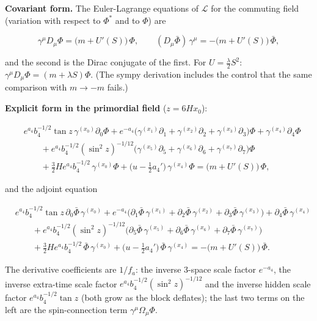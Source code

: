\documentclass[11pt]{article}
\begin{document}
\textbf{Covariant form.} The Euler-Lagrange equations of $\mathcal{L}$ for the commuting field (variation with respect to $\Phi^*$ and to $\Phi$) are

\[
\gamma^\mu D_\mu\Phi = \big(m + U'(S)\big)\,\Phi, \qquad (D_\mu\bar\Phi)\,\gamma^\mu = -\big(m + U'(S)\big)\,\bar\Phi ,
\]

and the second is the Dirac conjugate of the first. For $U = \tfrac{\lambda}{2}S^2$: $\gamma^\mu D_\mu\Phi = (m + \lambda S)\Phi$. (The sympy derivation includes the control that the same comparison with $m \to -m$ fails.)

\textbf{Explicit form in the primordial field} ($z = 6Hx_0$):

\[
\begin{aligned}
& e^{a_4}b_4^{-1/2}\tan z\,\gamma^{(x_0)}\partial_0\Phi + e^{-a_4}\big(\gamma^{(x_1)}\partial_1 + \gamma^{(x_2)}\partial_2 + \gamma^{(x_3)}\partial_3\big)\Phi + \gamma^{(x_4)}\partial_4\Phi \\
& \qquad + e^{a_4}b_4^{-1/2}(\sin^2 z)^{-1/12}\big(\gamma^{(x_5)}\partial_5 + \gamma^{(x_6)}\partial_6 + \gamma^{(x_7)}\partial_7\big)\Phi \\
& \qquad + \tfrac32He^{a_4}b_4^{-1/2}\,\gamma^{(x_0)}\Phi + \big(u - \tfrac12a_4'\big)\,\gamma^{(x_4)}\Phi = \big(m + U'(S)\big)\,\Phi ,
\end{aligned}
\]

and the adjoint equation

\[
\begin{aligned}
& e^{a_4}b_4^{-1/2}\tan z\,\partial_0\bar\Phi\,\gamma^{(x_0)} + e^{-a_4}\big(\partial_1\bar\Phi\,\gamma^{(x_1)} + \partial_2\bar\Phi\,\gamma^{(x_2)} + \partial_3\bar\Phi\,\gamma^{(x_3)}\big) + \partial_4\bar\Phi\,\gamma^{(x_4)} \\
& \qquad + e^{a_4}b_4^{-1/2}(\sin^2 z)^{-1/12}\big(\partial_5\bar\Phi\,\gamma^{(x_5)} + \partial_6\bar\Phi\,\gamma^{(x_6)} + \partial_7\bar\Phi\,\gamma^{(x_7)}\big) \\
& \qquad + \tfrac32He^{a_4}b_4^{-1/2}\,\bar\Phi\,\gamma^{(x_0)} + \big(u - \tfrac12a_4'\big)\,\bar\Phi\,\gamma^{(x_4)} = -\big(m + U'(S)\big)\,\bar\Phi .
\end{aligned}
\]

The derivative coefficients are $1/f_a$: the inverse 3-space scale factor $e^{-a_4}$, the inverse extra-time scale factor $e^{a_4}b_4^{-1/2}(\sin^2 z)^{-1/12}$ and the inverse hidden scale factor $e^{a_4}b_4^{-1/2}\tan z$ (both grow as the block deflates); the last two terms on the left are the spin-connection term $\gamma^\mu\Omega_\mu\Phi$.
\end{document}
